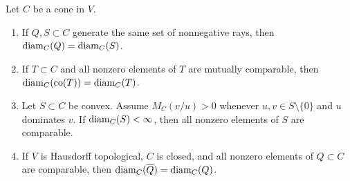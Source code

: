 \begin{proposition}
Let $C$ be a cone in $V$.
\begin{enumerate}[label=(\alph*)]
\item If $Q,S\subset C$ generate the same set of nonnegative rays, then $\operatorname{diam}_C(Q)=\operatorname{diam}_C(S)$.
\item If $T\subset C$ and all nonzero elements of $T$ are mutually comparable, then
$\operatorname{diam}_C(\operatorname{co}(T))=\operatorname{diam}_C(T)$.
\item Let $S\subset C$ be convex.  Assume $M_C(v/u)>0$ whenever $u,v\in S\setminus\{0\}$ and $u$ dominates $v$.  If $\operatorname{diam}_C(S)<\infty$, then all nonzero elements of $S$ are comparable.
\item If $V$ is Hausdorff topological, $C$ is closed, and all nonzero elements of $Q\subset C$ are comparable, then
$\operatorname{diam}_C(\overline{Q})=\operatorname{diam}_C(Q)$.
\end{enumerate}
\end{proposition}

